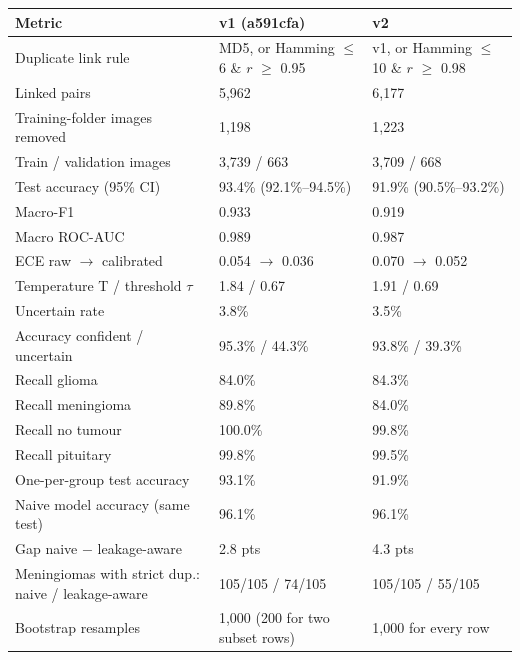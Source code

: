 \begin{tabular}{lll}
\toprule
Metric & v1 (a591cfa) & v2 \\
\midrule
Duplicate link rule & MD5, or Hamming $\le$ 6 \& $r$ $\ge$ 0.95 & v1, or Hamming $\le$ 10 \& $r$ $\ge$ 0.98 \\
Linked pairs & 5,962 & 6,177 \\
Training-folder images removed & 1,198 & 1,223 \\
Train / validation images & 3,739 / 663 & 3,709 / 668 \\
Test accuracy (95\% CI) & 93.4\% (92.1\%--94.5\%) & 91.9\% (90.5\%--93.2\%) \\
Macro-F1 & 0.933 & 0.919 \\
Macro ROC-AUC & 0.989 & 0.987 \\
ECE raw $\to$ calibrated & 0.054 $\to$ 0.036 & 0.070 $\to$ 0.052 \\
Temperature T / threshold $\tau$ & 1.84 / 0.67 & 1.91 / 0.69 \\
Uncertain rate & 3.8\% & 3.5\% \\
Accuracy confident / uncertain & 95.3\% / 44.3\% & 93.8\% / 39.3\% \\
Recall glioma & 84.0\% & 84.3\% \\
Recall meningioma & 89.8\% & 84.0\% \\
Recall no tumour & 100.0\% & 99.8\% \\
Recall pituitary & 99.8\% & 99.5\% \\
One-per-group test accuracy & 93.1\% & 91.9\% \\
Naive model accuracy (same test) & 96.1\% & 96.1\% \\
Gap naive $-$ leakage-aware & 2.8 pts & 4.3 pts \\
Meningiomas with strict dup.: naive / leakage-aware & 105/105 / 74/105 & 105/105 / 55/105 \\
Bootstrap resamples & 1,000 (200 for two subset rows) & 1,000 for every row \\
\bottomrule
\end{tabular}
